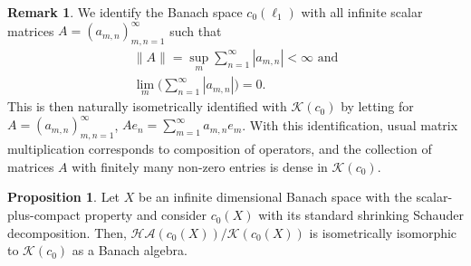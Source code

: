 \documentclass[11pt]{amsart}
\theoremstyle{definition}
\newtheorem{proposition}[theorem]{Proposition}
\newtheorem{remark}[theorem]{Remark}
\numberwithin{equation}{section}
\begin{document}
\begin{remark}
We identify the Banach space $c_0(\ell_1)$ with all infinite scalar matrices $A = (a_{m,n})_{m,n=1}^\infty$ such that
\begin{gather}
\|A\| = \sup_m\sum_{n=1}^\infty|a_{m,n}|<\infty\text{ and}\\
\lim_m\Big(\sum_{n=1}^\infty|a_{m,n}|\Big) = 0.
\end{gather}
This is then naturally isometrically identified with $\mathcal{K}(c_0)$ by letting for $A = (a_{m,n})_{m,n=1}^\infty$, $Ae_n = \sum_{m=1}^\infty a_{m,n}e_m$. With this identification, usual matrix multiplication corresponds to composition of operators, and the collection of matrices $A$ with finitely many non-zero entries is dense in $\mathcal{K}(c_0)$.
\end{remark}



\begin{proposition}
\label{horizontally approximable by compact in c0 of scalar-plus-compact}
Let $X$ be an infinite dimensional Banach space with the scalar-plus-compact property and consider $c_0(X)$ with its standard shrinking Schauder decomposition. Then, $\mathcal{HA}(c_0(X))/\mathcal{K}(c_0(X))$ is isometrically isomorphic to $\mathcal{K}(c_0)$ as a Banach algebra.
\end{proposition}
\end{document}
